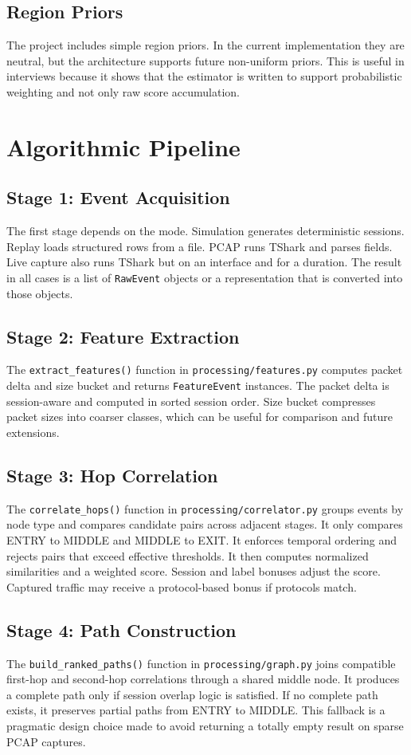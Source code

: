 \documentclass[12pt,a4paper]{report}
\begin{document}
\section{Region Priors}
The project includes simple region priors. In the current implementation they are neutral, but the architecture supports future non-uniform priors. This is useful in interviews because it shows that the estimator is written to support probabilistic weighting and not only raw score accumulation.

\chapter{Algorithmic Pipeline}
\section{Stage 1: Event Acquisition}
The first stage depends on the mode. Simulation generates deterministic sessions. Replay loads structured rows from a file. PCAP runs TShark and parses fields. Live capture also runs TShark but on an interface and for a duration. The result in all cases is a list of \texttt{RawEvent} objects or a representation that is converted into those objects.

\section{Stage 2: Feature Extraction}
The \texttt{extract\_features()} function in \texttt{processing/features.py} computes packet delta and size bucket and returns \texttt{FeatureEvent} instances. The packet delta is session-aware and computed in sorted session order. Size bucket compresses packet sizes into coarser classes, which can be useful for comparison and future extensions.

\section{Stage 3: Hop Correlation}
The \texttt{correlate\_hops()} function in \texttt{processing/correlator.py} groups events by node type and compares candidate pairs across adjacent stages. It only compares ENTRY to MIDDLE and MIDDLE to EXIT. It enforces temporal ordering and rejects pairs that exceed effective thresholds. It then computes normalized similarities and a weighted score. Session and label bonuses adjust the score. Captured traffic may receive a protocol-based bonus if protocols match.

\section{Stage 4: Path Construction}
The \texttt{build\_ranked\_paths()} function in \texttt{processing/graph.py} joins compatible first-hop and second-hop correlations through a shared middle node. It produces a complete path only if session overlap logic is satisfied. If no complete path exists, it preserves partial paths from ENTRY to MIDDLE. This fallback is a pragmatic design choice made to avoid returning a totally empty result on sparse PCAP captures.
\end{document}
